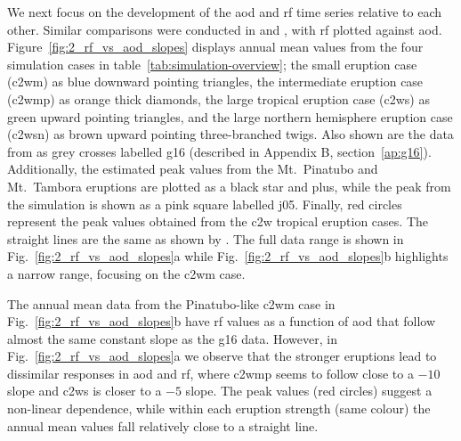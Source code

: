 \documentclass{ametsocV6.1}
\begin{document}
We next focus on the development of the \gls{aod} and \gls{rf} time series relative to
each other. Similar comparisons were conducted in \citet[][their Fig.\ 4]{gregory2016}
and \citet[][their Fig.\ 1]{marshall2020}, with \gls{rf} plotted against \gls{aod}.
Figure~\ref{fig:2_rf_vs_aod_slopes} displays annual mean values from the four simulation
cases in table~\ref{tab:simulation-overview}; the small eruption case (\gls{c2wm}) as
blue downward pointing triangles, the intermediate eruption case (\gls{c2wmp}) as orange
thick diamonds, the large tropical eruption case (\gls{c2ws}) as green upward pointing
triangles, and the large northern hemisphere eruption case (\gls{c2wsn}) as brown upward
pointing three-branched twigs. Also shown are the data from \citet[][Fig.\ 4, black
  crosses from HadCM3 sstPiHistVol]{gregory2016} as grey crosses labelled \gls{g16}
(described in Appendix B, section~\ref{ap:g16}). Additionally, the estimated peak values
from the Mt.\ Pinatubo and Mt.\ Tambora eruptions are plotted as a black star and plus,
while the peak from the \citet{jones2005} simulation is shown as a pink square labelled
\gls{j05}. Finally, red circles represent the peak values obtained from the \gls{c2w}
tropical eruption cases. The straight lines are the same as shown by
\citet{gregory2016}. The full data range is shown in Fig.~\ref{fig:2_rf_vs_aod_slopes}a
while Fig.~\ref{fig:2_rf_vs_aod_slopes}b highlights a narrow range, focusing on the
\gls{c2wm} case.

The annual mean data from the Pinatubo-like \gls{c2wm} case in
Fig.~\ref{fig:2_rf_vs_aod_slopes}b have \gls{rf} values as a function of \gls{aod} that
follow almost the same constant slope as the \gls{g16} data. However, in
Fig.~\ref{fig:2_rf_vs_aod_slopes}a we observe that the stronger eruptions lead to
dissimilar responses in \gls{aod} and \gls{rf}, where \gls{c2wmp} seems to follow close
to a \(-10\) slope and \gls{c2ws} is closer to a \(-5\) slope.
The peak values (red circles) suggest a non-linear dependence, while within each
eruption strength (same colour) the annual mean values fall relatively close to a
straight line.
\end{document}

